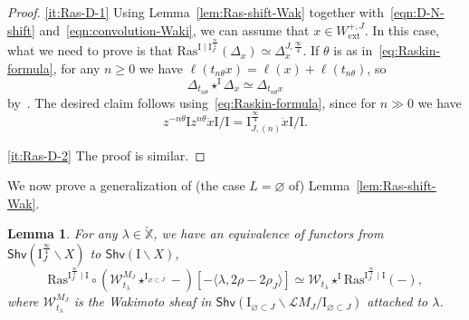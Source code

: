 \documentclass[11pt]{amsart}
\numberwithin{equation}{section}
\theoremstyle{plain}
\newtheorem{lem}[thm]{Lemma}
\theoremstyle{definition}
\newcommand{\I}{{\mathrm I}}
\newcommand{\sL}{{\mathcal L}}
\newcommand{\sW}{{\mathcal W}}
\newcommand{\X}{{\mathbb X}}
\newcommand{\Xd}{\check{\X}}
\newcommand{\quar}{{{\frac{\infty}{4}}}}
\newcommand{\ex}{\mathrm{ext}}
\newcommand{\Shv}{\mathsf{Shv}}
\newcommand{\Ras}{\mathrm{Ras}}
\newcommand{\comp}{\mathrm{c}}
\DeclareMathOperator*{\colim}{colim}
\begin{document}
\begin{proof}
\eqref{it:Ras-D-1}
Using Lemma~\ref{lem:Ras-shift-Wak} together with~\eqref{eqn:D-N-shift} and~\eqref{eqn:convolution-Waki}, we can assume that $x \in W_\ex^{+,J}$. In this case, what we need to prove is that $\Ras^{\I \mid \I_J^{\quar}} ( \Delta_x) \simeq \Delta^{J,\quar}_x$.
If $\theta$ is as in~\eqref{eq:Raskin-formula}, for any $n \geq 0$ we have $\ell(t_{n\theta} x) = \ell(x)+\ell(t_{n\theta})$, so
\[
\Delta_{t_{n\theta}} \star^{\I} \Delta_x \simeq \Delta_{t_{n\theta} x}
\]
by~\cite[Lemma~4.1(1)]{adr}.
The desired claim follows using~\eqref{eq:Raskin-formula}, since for $n \gg 0$ we have
\[
z^{-n\theta}\I z^{n\theta} \dot{x} \I/\I = \I^{\quar}_{J,(n)} \dot{x} \I/\I.
\]

\eqref{it:Ras-D-2}
The proof is similar.
\end{proof}

We now prove a generalization of (the case $L=\varnothing$ of) Lemma~\ref{lem:Ras-shift-Wak}.

\begin{lem}
\label{lem:Ras-convolution-Wak}
For any $\lambda\in \Xd$, we have an equivalence of functors from $\Shv(\I^{\quar}_J\backslash X)$ to $\Shv(\I\backslash X)$, 
\begin{equation*}
\Ras^{\I_J^{\quar}\mid \I} \circ (\sW^{M_J}_{t_\lambda} \star^{\I_{\varnothing \subset J}} -) [-\langle \lambda, 2\rho-2\rho_J \rangle]
\simeq \sW_{t_\lambda} \star^{\I} \Ras^{\I_J^{\quar}\mid \I} (-),
\end{equation*}
where $\sW^{M_J}_{t_\lambda}$ is the Wakimoto sheaf in $\Shv(\I_{\varnothing \subset J}\backslash \sL{M}_J/\I_{\varnothing \subset J})$ attached to $\lambda$. 
\end{lem}
\end{document}
